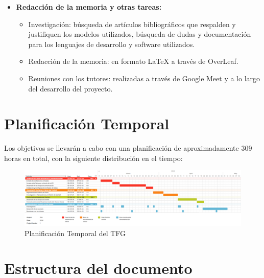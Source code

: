 \begin{itemize}
    \item \textbf{Redacción de la memoria y otras tareas:}
    \begin{itemize}
        \item Investigación: búsqueda de artículos bibliográficos que respalden y justifiquen los modelos utilizados, búsqueda de dudas y documentación para los lenguajes de desarrollo y software utilizados.
        \item Redacción de la memoria: en formato LaTeX a través de OverLeaf.
        \item Reuniones con los tutores: realizadas a través de Google Meet y a lo largo del desarrollo del proyecto.
    \end{itemize} 
\end{itemize}




\section{Planificación Temporal}

Los objetivos se llevarán a cabo con una planificación de aproximadamente 309 horas en total, con la siguiente distribución en el tiempo:

\begin{figure}[h]
        \centering
        \includegraphics[width=16cm]{Imágenes/Capítulo 1/Ilustración 3. Planificación temporal.png}
        \caption{Planificación Temporal del TFG}
        \label{fig:planificacion_temporal_TFG}
    \end{figure}

\section{Estructura del documento}

